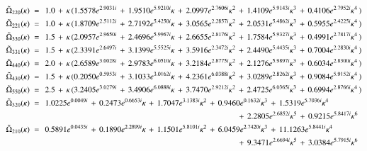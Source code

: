 \begin{align}
	\label{eq:cw_fit_1}
	\CW_{220}(\kappa) \; &= \;\, 1.0 \, + \, \kappa \, (1.5578 e^{2.9031 i}\, + \, 1.9510  e^{5.9210 i} \kappa\, + \, 2.0997  e^{2.7606 i} \kappa ^ 2\, + \, 1.4109  e^{5.9143 i} \kappa ^ 3\, + \, 0.4106  e^{2.7952 i} \kappa ^ 4 \, )  \\ 
	\label{eq:cw_fit_2}
	\CW_{221}(\kappa) \; &= \;\, 1.0 \, + \, \kappa \, (1.8709 e^{2.5112 i}\, + \, 2.7192  e^{5.4250 i} \kappa\, + \, 3.0565  e^{2.2857 i} \kappa ^ 2\, + \, 2.0531  e^{5.4862 i} \kappa ^ 3\, + \, 0.5955  e^{2.4225 i} \kappa ^ 4 \, )  \\ 
	\label{eq:cw_fit_3}
	\CW_{330}(\kappa) \; &= \;\, 1.5 \, + \, \kappa \, (2.0957 e^{2.9650 i}\, + \, 2.4696  e^{5.9967 i} \kappa\, + \, 2.6655  e^{2.8176 i} \kappa ^ 2\, + \, 1.7584  e^{5.9327 i} \kappa ^ 3\, + \, 0.4991  e^{2.7817 i} \kappa ^ 4 \, )  \\ 
	\label{eq:cw_fit_4}
	\CW_{331}(\kappa) \; &= \;\, 1.5 \, + \, \kappa \, (2.3391 e^{2.6497 i}\, + \, 3.1399  e^{5.5525 i} \kappa\, + \, 3.5916  e^{2.3472 i} \kappa ^ 2\, + \, 2.4490  e^{5.4435 i} \kappa ^ 3\, + \, 0.7004  e^{2.2830 i} \kappa ^ 4 \, )  \\ 
	\label{eq:cw_fit_5}
	\CW_{440}(\kappa) \; &= \;\, 2.0 \, + \, \kappa \, (2.6589 e^{3.0028 i}\, + \, 2.9783  e^{6.0510 i} \kappa\, + \, 3.2184  e^{2.8775 i} \kappa ^ 2\, + \, 2.1276  e^{5.9897 i} \kappa ^ 3\, + \, 0.6034  e^{2.8300 i} \kappa ^ 4 \, )  \\ 
	\label{eq:cw_fit_6}
	\CW_{430}(\kappa) \; &= \;\, 1.5 \, + \, \kappa \, (0.2050 e^{0.5953 i}\, + \, 3.1033  e^{3.0162 i} \kappa\, + \, 4.2361  e^{6.0388 i} \kappa ^ 2\, + \, 3.0289  e^{2.8262 i} \kappa ^ 3\, + \, 0.9084  e^{5.9152 i} \kappa ^ 4 \, )  \\ 
	\label{eq:cw_fit_7}
	\CW_{550}(\kappa) \; &= \;\, 2.5 \, + \, \kappa \, (3.2405 e^{3.0279 i}\, + \, 3.4906  e^{6.0888 i} \kappa\, + \, 3.7470  e^{2.9212 i} \kappa ^ 2\, + \, 2.4725  e^{6.0365 i} \kappa ^ 3\, + \, 0.6994  e^{2.8766 i} \kappa ^ 4 \, )  \\ 
	\label{eq:cw_fit_8}
	\CW_{320}(\kappa) \; &= \;\,1.0225 e^{0.0049 i}\, + \, 0.2473  e^{0.6653 i} \kappa\, + \, 1.7047  e^{3.1383 i} \kappa ^ 2\, + \, 0.9460  e^{0.1632 i} \kappa ^ 3\, + \, 1.5319  e^{5.7036 i} \kappa ^ 4\\ \nonumber
	&\hspace{255pt}\, + \, 2.2805  e^{2.6852 i} \kappa ^ 5\, + \, 0.9215  e^{5.8417 i} \kappa ^ 6 \\ 
	\label{eq:cw_fit_9}
	\CW_{210}(\kappa) \; &= \;\,0.5891 e^{0.0435 i}\, + \, 0.1890  e^{2.2899 i} \kappa\, + \, 1.1501  e^{5.8101 i} \kappa ^ 2\, + \, 6.0459  e^{2.7420 i} \kappa ^ 3\, + \, 11.1263  e^{5.8441 i} \kappa ^ 4\\ \nonumber
	&\hspace{255pt}\, + \, 9.3471  e^{2.6694 i} \kappa ^ 5\, + \, 3.0384  e^{5.7915 i} \kappa ^ 6
\end{align}
